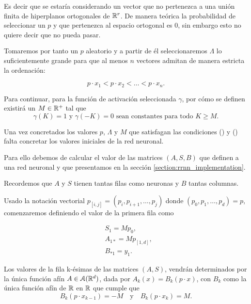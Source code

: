 Es decir que se estaría considerando un vector que no 
pertenezca a una unión finita de hiperplanos ortogonales de $\mathbb{R}^r$. 
De manera teórica la probabilidad de seleccionar un $p$ y 
que pertenezca al espacio ortogonal es $0$, sin embargo esto 
no quiere decir que no pueda pasar. 

Tomaremos por tanto un $p$ aleatorio y a partir de él 
seleccionaremos $\Lambda$ lo suficientemente grande para que
 al menos $n$ vectores admitan de manera estricta la ordenación: 

\begin{equation}\label{eq:method_inicializar_condition_desigualdad}
    p \cdot x_1 < 
    p \cdot x_2 
    < \ldots <
    p \cdot x_n.
\end{equation}

Para continuar, para la función de activación seleccionada $\gamma$, por cómo se definen existirá un $M \in \mathbb{R}^+$ tal que 
\begin{equation} \label{eq:method_inicializar_M}
    \gamma(K)=1 \text{ y } \gamma(-K)=0 
    \text{ sean constantes para todo }K \geq M.
\end{equation}

Una vez concretados los valores $p$, $\Lambda$ y $M$ que satisfagan las condiciones 
() 
y ()  
falta concretar los valores iniciales de la red neuronal. 

Para ello debemos de calcular el valor de las matrices $(A,S,B)$ que definen a una red neuronal y que presentamos en la sección \ref{section:rrnn_implementation}.

Recordemos que $A$ y $S$ tienen tantas filas como neuronas  y $B$ tantas columnas. 

Usado la notación vectorial
$p_{[i,j]} = (p_i, p_{i+1}, \ldots, p_{j})$ donde $(p_0, p_1, \ldots, p_d)=p$, comenzaremos definiendo el valor de la primera fila como

\begin{align}
    &S_1 = M p_0, \\
    & A_{1 *} = M p_{[1,d]}, \\
    & B_{* 1} = y_1.
\end{align}

Los valores de la fila  k-ésimas de las matrices $(A,S)$, vendrán determinados por la única función afín $A \in \mathcal{A}(\mathbb{R}^d)$, 
dada por $A_k(x)=B_k(p \cdot x)$, con $B_{k}$ como la única función afín de $\mathbb{R}$ en $\mathbb{R}$ que cumple que 
\begin{equation}
    B_k(p \cdot x_{k-1}) = -M 
    \quad \text{y} \quad 
     B_{k}(p \cdot x_k)= M.
\end{equation}

